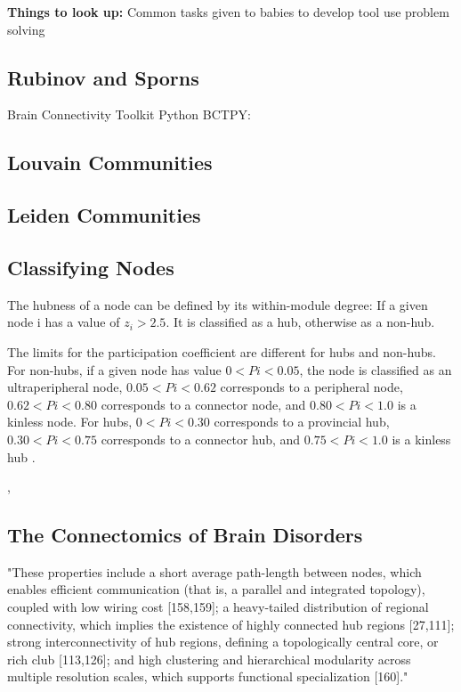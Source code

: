\documentclass{article}
\begin{document}
\textbf{Things to look up: } Common tasks given to babies to develop tool use problem solving

\subsection{Rubinov and Sporns \cite{rubinov_complex_2010}}
Brain Connectivity Toolkit
Python BCTPY: \cite{laplante_bctpy_nodate}

\subsection{Louvain Communities}
\cite{blondel_fast_2008}

\subsection{Leiden Communities}
\cite{traag_louvain_2019}

\subsection{Classifying Nodes}
The hubness of a node can be defined by its within-module degree: If a given node i has a value of $z_i > 2.5$. It is classified as a hub, otherwise as a non-hub. 

The limits for the participation coefficient are different for hubs and non-hubs. For non-hubs, if a given node has value $0 < Pi < 0.05$, the node is classified as an ultraperipheral node, $0.05 < Pi < 0.62$ corresponds to a peripheral node, $0.62 < Pi < 0.80$ corresponds to a connector node, and $0.80 < Pi < 1.0$ is a kinless node. For hubs, $0 < Pi < 0.30$ corresponds to a provincial hub, $0.30 < Pi < 0.75$ corresponds to a connector hub, and $0.75 < Pi < 1.0$ is a kinless hub \cite{meunier_hierarchical_2009}.

\cite{reams_emergence_2017}, \cite{freitag_analysis_2016}
\subsection{The Connectomics of Brain Disorders \cite{fornito_connectomics_2015}}
"These properties include a short average path-length between nodes, which enables efficient communication (that is, a parallel and integrated topology), coupled with low wiring cost [158,159]; a heavy-tailed distribution of regional connectivity, which implies the existence of highly connected hub regions [27,111]; strong interconnectivity of hub regions, defining a topologically central core, or rich club [113,126]; and high clustering and hierarchical modularity across multiple resolution scales, which supports functional specialization [160]."
\end{document}
